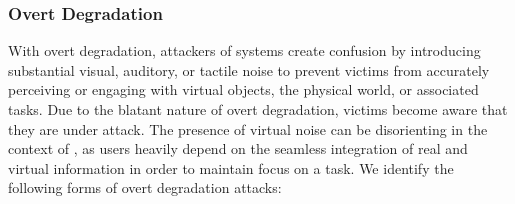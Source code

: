 \subsubsection{Overt Degradation} 
     With overt degradation, attackers of \MR systems create confusion by introducing substantial visual, auditory, or tactile noise to prevent victims from accurately perceiving or engaging with virtual objects, the physical world, or associated tasks.
     Due to the blatant nature of overt degradation, victims become aware that they are under attack.
     The presence of virtual noise can be disorienting in the context of \MR, as users heavily depend on the seamless integration of real and virtual information in order to maintain focus on a task. 
     We identify the following forms of overt degradation attacks:
     

